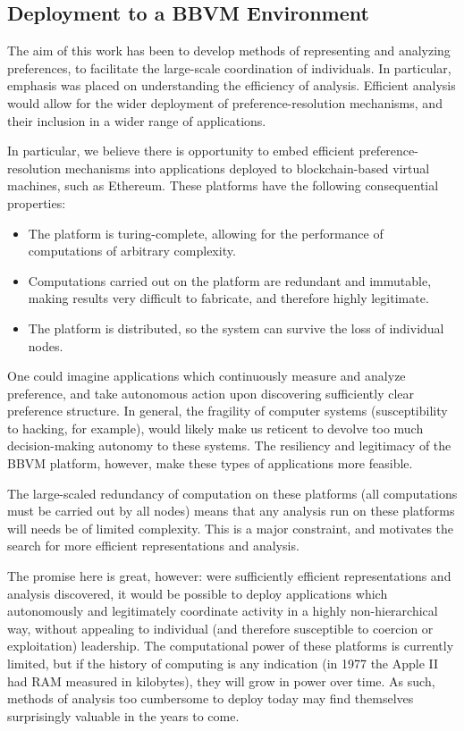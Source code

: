 \subsection{Deployment to a BBVM Environment}

The aim of this work has been to develop methods of representing and analyzing preferences, to facilitate the large-scale coordination of individuals.
In particular, emphasis was placed on understanding the efficiency of analysis.
Efficient analysis would allow for the wider deployment of preference-resolution mechanisms, and their inclusion in a wider range of applications.

\bigskip

In particular, we believe there is opportunity to embed efficient preference-resolution mechanisms into applications deployed to blockchain-based virtual machines, such as Ethereum.
These platforms have the following consequential properties:

\begin{itemize}
	\item The platform is turing-complete, allowing for the performance of computations of arbitrary complexity.
	\item Computations carried out on the platform are redundant and immutable, making results very difficult to fabricate, and therefore highly legitimate.
	\item The platform is distributed, so the system can survive the loss of individual nodes.
\end{itemize}

One could imagine applications which continuously measure and analyze preference, and take autonomous action upon discovering sufficiently clear preference structure.
In general, the fragility of computer systems (susceptibility to hacking, for example), would likely make us reticent to devolve too much decision-making autonomy to these systems.
The resiliency and legitimacy of the BBVM platform, however, make these types of applications more feasible.

\bigskip

The large-scaled redundancy of computation on these platforms (all computations must be carried out by all nodes) means that any analysis run on these platforms will needs be of limited complexity.
This is a major constraint, and motivates the search for more efficient representations and analysis.

The promise here is great, however: were sufficiently efficient representations and analysis discovered, it would be possible to deploy applications which autonomously and legitimately coordinate activity  in a highly non-hierarchical way, without appealing to individual (and therefore susceptible to coercion or exploitation) leadership.
The computational power of these platforms is currently limited, but if the history of computing is any indication (in 1977 the Apple II had RAM measured in kilobytes), they will grow in power over time.
As such, methods of analysis too cumbersome to deploy today may find themselves surprisingly valuable in the years to come.

